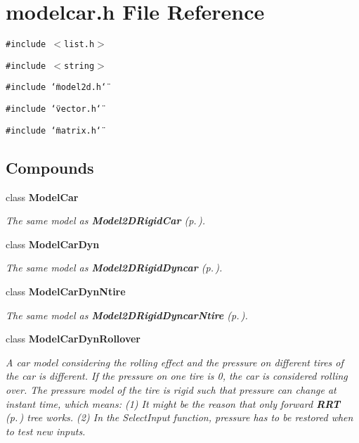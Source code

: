 \section{modelcar.h File Reference}
\label{modelcar_8h}
{\tt \#include $<$list.h$>$}\par
{\tt \#include $<$string$>$}\par
{\tt \#include \char`\"{}model2d.h\char`\"{}}\par
{\tt \#include \char`\"{}vector.h\char`\"{}}\par
{\tt \#include \char`\"{}matrix.h\char`\"{}}\par
\subsection*{Compounds}
\begin{CompactItemize}
\item 
class {\bf Model\-Car}
\begin{CompactList}\small\item\em The same model as {\bf Model2DRigid\-Car} {\rm (p.\,\pageref{classModel2DRigidCar})}.\item\end{CompactList}\item 
class {\bf Model\-Car\-Dyn}
\begin{CompactList}\small\item\em The same model as {\bf Model2DRigid\-Dyncar} {\rm (p.\,\pageref{classModel2DRigidDyncar})}.\item\end{CompactList}\item 
class {\bf Model\-Car\-Dyn\-Ntire}
\begin{CompactList}\small\item\em The same model as {\bf Model2DRigid\-Dyncar\-Ntire} {\rm (p.\,\pageref{classModel2DRigidDyncarNtire})}.\item\end{CompactList}\item 
class {\bf Model\-Car\-Dyn\-Rollover}
\begin{CompactList}\small\item\em A car model considering the rolling effect and the pressure on different tires of the car is different. If the pressure on one tire is 0, the car is considered rolling over. The pressure model of the tire is rigid such that pressure can change at instant time, which means: (1) It might be the reason that only forward {\bf RRT} {\rm (p.\,\pageref{classRRT})} tree works. (2) In the Select\-Input function, pressure has to be restored when to test new inputs.\item\end{CompactList}\item 

\end{CompactItemize}
